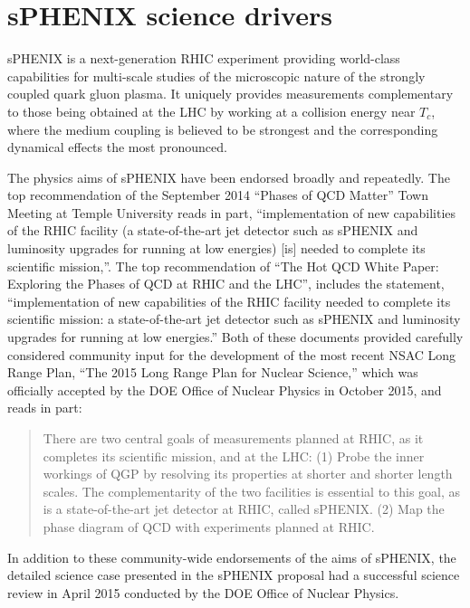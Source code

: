 \section{sPHENIX science drivers}

sPHENIX is a next-generation RHIC experiment providing world-class
capabilities for multi-scale studies of the microscopic nature
of the strongly coupled quark gluon plasma.
It uniquely provides measurements complementary to those being
obtained at the LHC by working at a collision energy near $T_c$, where
the medium coupling is believed to be strongest and the corresponding
dynamical effects the most pronounced.

The physics aims of sPHENIX have been endorsed broadly and repeatedly.
The top recommendation of the September 2014 ``Phases of QCD Matter''
Town Meeting at Temple University reads in part, ``implementation of
new capabilities of the RHIC facility (a state-of-the-art jet detector
such as sPHENIX and luminosity upgrades for running at low energies)
[is] needed to complete its scientific mission,''.  The top
recommendation of ``The Hot QCD White Paper: Exploring the Phases of
QCD at RHIC and the LHC'', includes the statement, ``implementation of
new capabilities of the RHIC facility needed to complete its
scientific mission: a state-of-the-art jet detector such as sPHENIX
and luminosity upgrades for running at low energies.'' Both of these
documents provided carefully considered community input for the
development of the most recent NSAC Long Range Plan, ``The 2015 Long
Range Plan for Nuclear Science,'' which was officially accepted by the
DOE Office of Nuclear Physics in October 2015, and reads in part:

\blockquote{There are two central goals of measurements planned at
  RHIC, as it completes its scientific mission, and at the LHC: (1)
  Probe the inner workings of QGP by resolving its properties at
  shorter and shorter length scales. The complementarity of the two
  facilities is essential to this goal, as is a state-of-the-art jet
  detector at RHIC, called sPHENIX. (2) Map the phase diagram of QCD
  with experiments planned at RHIC.}

In addition to these community-wide endorsements of the aims of
sPHENIX, the detailed science case presented in the sPHENIX proposal
had a successful science review in April 2015 conducted by the DOE
Office of Nuclear Physics.


